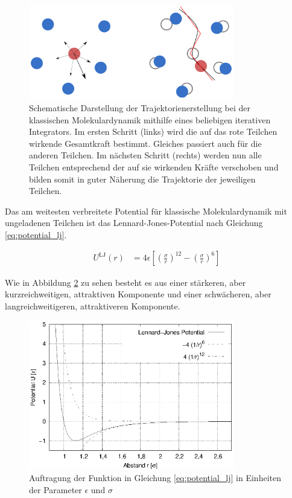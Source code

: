 		\begin{figure}[!ht]
			\centering
			\includegraphics[width=0.8\textwidth]{chapter/main/img/scheme_md.png}
			\caption{Schematische Darstellung der Trajektorienerstellung bei der klassischen
			Molekulardynamik mithilfe eines beliebigen iterativen Integrators. Im ersten Schritt
			(links) wird die auf das rote Teilchen wirkende Gesamtkraft bestimmt. Gleiches
			passiert auch für die anderen Teilchen. Im nächsten Schritt (rechts) werden nun alle
			Teilchen entsprechend der auf sie wirkenden Kräfte verschoben und bilden somit in
			guter Näherung die Trajektorie der jeweiligen Teilchen.
			\cite[S. 52]{sonntag2011computer}}
			\label{fig:scheme_md}
		\end{figure}

		Das am weitesten verbreitete Potential für klassische Molekulardynamik mit ungeladenen
		Teilchen ist das Lennard-Jones-Potential nach Gleichung \eqref{eq:potential_lj}.

		\begin{align}
			U^\text{LJ}(r) &= 4\epsilon \left[
				\left(\frac{\sigma}{r}\right)^{12}
				-
				\left(\frac{\sigma}{r}\right)^{6}
			\right] \label{eq:potential_lj}
		\end{align}

		Wie in Abbildung \ref{fig:potential_lj} zu sehen besteht es aus einer stärkeren, aber
		kurzreichweitigen, attraktiven Komponente und einer schwächeren, aber langreichweitigeren,
		attraktiveren Komponente.

		\begin{figure}[!ht]
			\centering
			\includegraphics[width=0.8\textwidth]{chapter/main/plt/lennard_jones.eps}
			\caption{Auftragung der Funktion in Gleichung \eqref{eq:potential_lj} in Einheiten
			der Parameter $\epsilon$ und $\sigma$}
			\label{fig:potential_lj}
		\end{figure}

